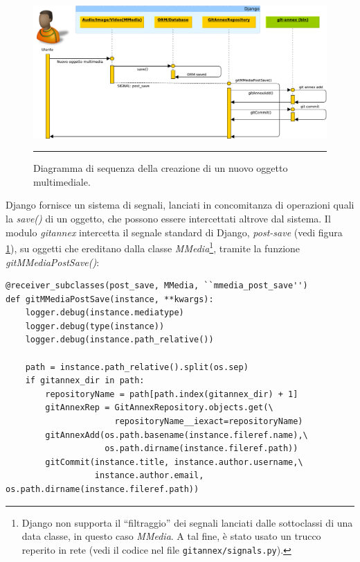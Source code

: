 \begin{figure}[htbp]
  \centering
  \includegraphics[width=\textwidth]{./Figure/SequenceDiagram_NuovoOggetto-crop.pdf}
  \rule{35em}{0.5pt}
  \caption[Diagramma di sequenza della creazione di un nuovo oggetto
  multimediale]{Diagramma di sequenza della creazione di un nuovo
    oggetto multimediale.}
  \label{fig:SequenceDiagramAdd}
\end{figure}

Django fornisce un sistema di segnali, lanciati in concomitanza di
operazioni quali la \emph{save()} di un oggetto, che possono essere
intercettati altrove dal sistema. Il modulo \emph{gitannex} intercetta
il segnale standard di Django, \emph{post-save} (vedi figura
\ref{fig:SequenceDiagramAdd}), su oggetti che ereditano dalla classe
\emph{MMedia}\footnote{Django non supporta il ``filtraggio'' dei
  segnali lanciati dalle sottoclassi di una data classe, in questo
  caso \emph{MMedia}. A tal fine, è stato usato un trucco reperito in
  rete (vedi il codice nel file \texttt{gitannex/signals.py}).},
tramite la funzione \emph{gitMMediaPostSave()}:


\begin{lstlisting}
@receiver_subclasses(post_save, MMedia, ``mmedia_post_save'')
def gitMMediaPostSave(instance, **kwargs):
    logger.debug(instance.mediatype)
    logger.debug(type(instance))
    logger.debug(instance.path_relative())

    path = instance.path_relative().split(os.sep)
    if gitannex_dir in path:
        repositoryName = path[path.index(gitannex_dir) + 1]
        gitAnnexRep = GitAnnexRepository.objects.get(\
                      repositoryName__iexact=repositoryName)
        gitAnnexAdd(os.path.basename(instance.fileref.name),\
                    os.path.dirname(instance.fileref.path))
        gitCommit(instance.title, instance.author.username,\
                  instance.author.email, os.path.dirname(instance.fileref.path))
\end{lstlisting}








